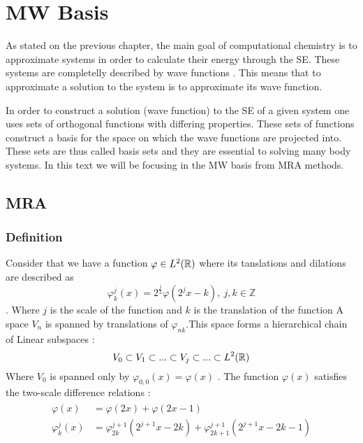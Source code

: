 \documentclass[../master_thesis.tex]{subfiles}
\begin{document}
\chapter{\ac{MW} Basis}
As stated on the previous chapter, the main goal of computational chemistry is
to approximate systems in order to calculate their energy through the \newline \ac{SE}. %
These systems are completelly described by wave functions \cite{Cohen:1973}.
This means that to approximate a solution to the system is to approximate its
wave function.

In order to construct a solution (wave function) to the \ac{SE} of a given
system one uses sets of orthogonal functions with differing properties. These
sets of functions construct a basis for the space on which the wave functions
are projected into. These sets are thus called basis sets \cite{Cramer:2004}
and they are essential to solving many body systems. In this text we will be
focusing in the \ac{MW} basis from \ac{MRA} methods.

\section{\ac{MRA}}
\subsection{Definition}
Consider that we have a function $\varphi \in L^2(\mathbb{R})$ where its tanslations
and dilations are described as \cite{Schneider:2007}
\begin{equation}
  \varphi^j_k(x) = 2^{\frac{j}{2}}\varphi(2^jx - k),\  j,k \in \mathbb{Z}
\end{equation}.
Where $j$ is the scale of the function and $k$ is the translation of the function
\cite{Sorland}
A space $V_n$ is spanned by translations of $\varphi_{nk}$.This space forms a
hierarchical chain of Linear
subspaces \cite{Beylkin:MRA}:
\begin{equation}
  V_0 \subset V_1 \subset ... \subset V_j \subset ... \subset L^2(\mathbb{R})\label{eq:seqsubspace}
\end{equation}
Where $V_0$ is spanned only by $\varphi_{0,0}(x)=\varphi(x)$ \cite{Sorland}.
The function $\varphi(x)$ satisfies the two-scale difference relations \cite{Beylkin:MRA, Schneider:2007, Sorland}:
\begin{align}
  \begin{split}
    \varphi(x) &= \varphi(2x) + \varphi(2x - 1)\\
    \varphi^j_k(x) &= \varphi^{j+1}_{2k}(2^{j+1}x - 2k) + \varphi^{j+1}_{2k+1}(2^{j+1}x - 2k - 1)
  \end{split}
\end{align}
\end{document}
